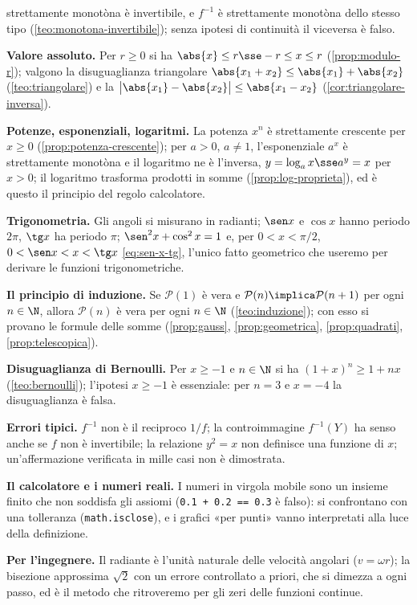 \begin{puntichiave}
strettamente monotòna è invertibile, e $f^{-1}$ è strettamente monotòna dello stesso tipo
(\cref{teo:monotona-invertibile}); senza ipotesi di continuità il viceversa è falso.
\item \textbf{Valore assoluto.} Per $r\ge0$ si ha $\abs{x}\le r\sse-r\le x\le r$
(\cref{prop:modulo-r}); valgono la disuguaglianza triangolare
$\abs{x_{1}+x_{2}}\le\abs{x_{1}}+\abs{x_{2}}$ (\cref{teo:triangolare}) e la
$\bigl|\abs{x_{1}}-\abs{x_{2}}\bigr|\le\abs{x_{1}-x_{2}}$ (\cref{cor:triangolare-inversa}).
\item \textbf{Potenze, esponenziali, logaritmi.} La potenza $x^{n}$ è strettamente
crescente per $x\ge0$ (\cref{prop:potenza-crescente}); per $a>0$, $a\neq1$,
l'esponenziale $a^{x}$ è strettamente monotòna e il logaritmo ne è l'inversa,
$y=\log_{a}x\sse a^{y}=x$ per $x>0$; il logaritmo trasforma prodotti in somme
(\cref{prop:log-proprieta}), ed è questo il principio del regolo calcolatore.
\item \textbf{Trigonometria.} Gli angoli si misurano in radianti; $\sen x$ e $\cos x$
hanno periodo $2\pi$, $\tg x$ ha periodo $\pi$; $\sen^{2}x+\cos^{2}x=1$ e, per
$0<x<\pi/2$, $0<\sen x<x<\tg x$ \eqref{eq:sen-x-tg}, l'unico fatto geometrico che
useremo per derivare le funzioni trigonometriche.
\item \textbf{Il principio di induzione.} Se $\mathcal{P}(1)$ è vera e
$\mathcal{P}(n)\implica\mathcal{P}(n+1)$ per ogni $n\in\N$, allora $\mathcal{P}(n)$ è vera
per ogni $n\in\N$ (\cref{teo:induzione}); con esso si provano le formule delle somme
(\cref{prop:gauss}, \cref{prop:geometrica}, \cref{prop:quadrati},
\cref{prop:telescopica}).
\item \textbf{Disuguaglianza di Bernoulli.} Per $x\ge-1$ e $n\in\N$ si ha
$(1+x)^{n}\ge1+nx$ (\cref{teo:bernoulli}); l'ipotesi $x\ge-1$ è essenziale: per $n=3$ e
$x=-4$ la disuguaglianza è falsa.
\item \textbf{Errori tipici.} $f^{-1}$ non è il reciproco $1/f$; la controimmagine
$f^{-1}(Y)$ ha senso anche se $f$ non è invertibile; la relazione $y^{2}=x$ non definisce
una funzione di $x$; un'affermazione verificata in mille casi non è dimostrata.
\item \textbf{Il calcolatore e i numeri reali.} I numeri in virgola mobile sono un insieme
finito che non soddisfa gli assiomi (\texttt{0.1 + 0.2 == 0.3} è falso): si confrontano
con una tolleranza (\texttt{math.isclose}), e i grafici «per punti» vanno interpretati
alla luce della definizione.
\item \textbf{Per l'ingegnere.} Il radiante è l'unità naturale delle velocità angolari
($v=\omega r$); la bisezione approssima $\sqrt2$ con un errore controllato a priori, che
si dimezza a ogni passo, ed è il metodo che ritroveremo per gli zeri delle funzioni
continue.
\end{puntichiave}

